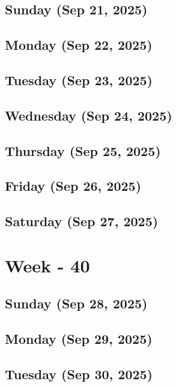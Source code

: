\subsection*{Sunday (Sep 21, 2025)}
\subsection*{Monday (Sep 22, 2025)}
\subsection*{Tuesday (Sep 23, 2025)}
\subsection*{Wednesday (Sep 24, 2025)}
\subsection*{Thursday (Sep 25, 2025)}
\subsection*{Friday (Sep 26, 2025)}
\subsection*{Saturday (Sep 27, 2025)}

\section{Week - 40}
\subsection*{Sunday (Sep 28, 2025)}
\subsection*{Monday (Sep 29, 2025)}
\subsection*{Tuesday (Sep 30, 2025)}


\newpage
\begin{spacing}{1.0}
\renewcommand{\bibname}{\bf{References}}


\end{spacing}